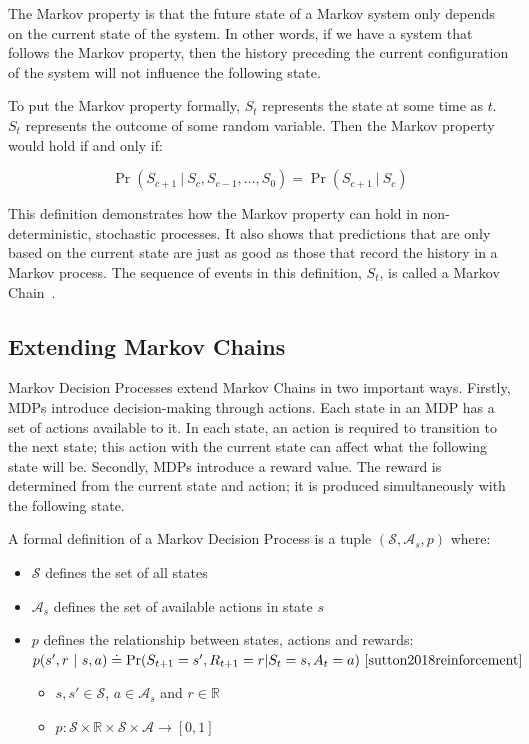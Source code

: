 \documentclass[]{final_report}
\begin{document}
The Markov property is that the future state of a Markov system only depends on the current state of the system. In other words, if we have a system that follows the Markov property, then the history preceding the current configuration of the system will not influence the following state.

To put the Markov property formally, $S_t$ represents the state at some time as $t$. $S_t$ represents the outcome of some random variable. Then the Markov property would hold if and only if:


\begin{equation}
  \Pr(S_{c+1}\ |\ S_{c},S_{c-1},\dots,S_0) = \Pr(S_{c+1}\ |\ S_{c})
  \label{eqn:markov-property}
\end{equation}

This definition demonstrates how the Markov property can hold in non-deterministic, stochastic processes. It also shows that predictions that are only based on the current state are just as good as those that record the history in a Markov process. The sequence of events in this definition, $S_t$, is called a Markov Chain~\cite{meyn2012markov}.

\subsection{Extending Markov Chains}

Markov Decision Processes extend Markov Chains in two important ways. Firstly, MDPs introduce decision-making through actions. Each state in an MDP has a set of actions available to it. In each state, an action is required to transition to the next state; this action with the current state can affect what the following state will be. Secondly, MDPs introduce a reward value. The reward is determined from the current state and action; it is produced simultaneously with the following state.

A formal definition of a Markov Decision Process is a tuple $(\mathcal{S},\mathcal{A}_s,p)$ where:
\begin{itemize}
  \item $\mathcal{S}$ defines the set of all states
  \item $\mathcal{A}_s$ defines the set of available actions in state $s$
  \item $p$ defines the relationship between states, actions and rewards: \\
        $p(s',r\ |\ s,a) \doteq \Pr(S_{t+1} = s', R_{t+1} = r | S_t = s, A_t = a)~\cite{sutton2018reinforcement}$
        \begin{itemize}
          \item $s, s' \in \mathcal{S}$, $a \in \mathcal{A}_s$ and $r \in \mathbb{R}$
          \item $p: \mathcal{S} \times \mathbb{R} \times \mathcal{S} \times \mathcal{A} \rightarrow [0,1]$
        \end{itemize}
\end{itemize}
\end{document}
